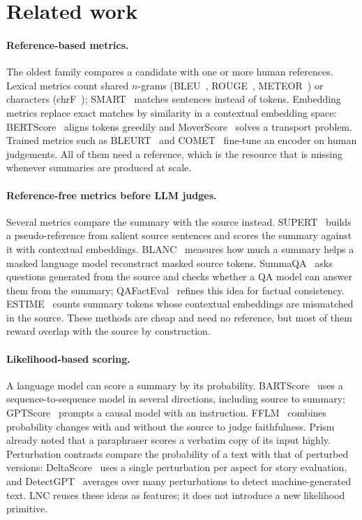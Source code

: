 \section{Related work}
\label{sec:related}

\paragraph{Reference-based metrics.} The oldest family compares a candidate with one or more human references. Lexical metrics count shared $n$-grams (BLEU~\citep{papineni2002bleu}, ROUGE~\citep{lin2004rouge}, METEOR~\citep{banerjee2005meteor}) or characters (chrF~\citep{popovic2015chrf}); SMART~\citep{amplayo2022smart} matches sentences instead of tokens. Embedding metrics replace exact matches by similarity in a contextual embedding space: BERTScore~\citep{zhang2020bertscore} aligns tokens greedily and MoverScore~\citep{zhao2019moverscore} solves a transport problem. Trained metrics such as BLEURT~\citep{sellam2020bleurt} and COMET~\citep{rei2020comet} fine-tune an encoder on human judgements. All of them need a reference, which is the resource that is missing whenever summaries are produced at scale.

\paragraph{Reference-free metrics before LLM judges.} Several metrics compare the summary with the source instead. SUPERT~\citep{gao2020supert} builds a pseudo-reference from salient source sentences and scores the summary against it with contextual embeddings. BLANC~\citep{vasilyev2020blanc} measures how much a summary helps a masked language model reconstruct masked source tokens. SummaQA~\citep{scialom2019summaqa} asks questions generated from the source and checks whether a QA model can answer them from the summary; QAFactEval~\citep{fabbri2022qafacteval} refines this idea for factual consistency. ESTIME~\citep{vasilyev2021estime} counts summary tokens whose contextual embeddings are mismatched in the source. These methods are cheap and need no reference, but most of them reward overlap with the source by construction.

\paragraph{Likelihood-based scoring.} A language model can score a summary by its probability. BARTScore~\citep{yuan2021bartscore} uses a sequence-to-sequence model in several directions, including source to summary; GPTScore~\citep{fu2023gptscore} prompts a causal model with an instruction. FFLM~\citep{jia2023fflm} combines probability changes with and without the source to judge faithfulness. Prism~\citep{thompson2020prism} already noted that a paraphraser scores a verbatim copy of its input highly. Perturbation contrasts compare the probability of a text with that of perturbed versions: DeltaScore~\citep{xie2023deltascore} uses a single perturbation per aspect for story evaluation, and DetectGPT~\citep{mitchell2023detectgpt} averages over many perturbations to detect machine-generated text. LNC reuses these ideas as features; it does not introduce a new likelihood primitive.

